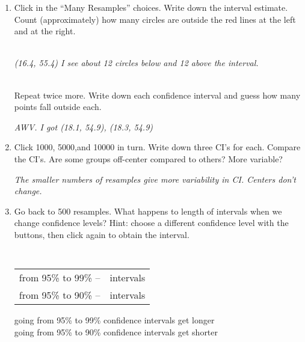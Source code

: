 \begin{enumerate}
\begin{enumerate}
\item  Click   in the ``Many Resamples'' choices.
 Write down the interval estimate.  Count
      (approximately) how many circles are outside the red
      lines at the left and at the right.
\begin{students}
        \vspace{1cm}        
\end{students}
\begin{key}
  \\{\it (16.4, 55.4)  I see about 12 circles below and  12 above the interval.}
\end{key}
\\
  Repeat twice more. Write down each confidence interval and guess how
  many points fall outside each.
\begin{students}
        \vspace{1cm}        
\end{students}
\begin{key}
{\it AWV. I got (18.1, 54.9), (18.3, 54.9)}
\end{key}

\item Click  1000,  5000,and 10000 in turn. Write down
  three CI's for each.  Compare the CI's.  Are some groups off-center compared
  to others?  More variable?

\begin{students}
\vspace{4cm}
\end{students}
\begin{key}
  {\it The smaller numbers of resamples give more variability in
    CI. Centers don't change.}
\end{key}


\item Go back to 500 resamples.  What happens to length of intervals
  when we change confidence levels?  Hint: choose a different
  confidence level with the buttons, then click  again
  to obtain the interval.\\
\begin{students}
{\large \tt
\begin{tabular}{rc}
from 95\% to 99\% --	&	intervals  \underline{\hspace*{2in}}\\
from 95\% to 90\% --	&	intervals \underline{\hspace*{2in}}\\
\end{tabular}
}
\end{students}
\begin{key}
going from 95\% to 99\%  confidence 	intervals get longer\\
going from 95\% to 90\%  confidence 	intervals get shorter
\end{key}
    \end{enumerate}



\end{enumerate}

